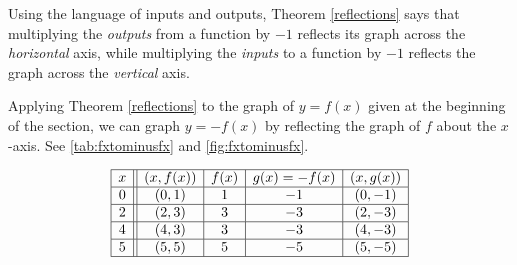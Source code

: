 Using the  language of inputs and outputs, Theorem \ref{reflections} says that multiplying the \textit{outputs} from a function by $-1$ reflects its graph across the \textit{horizontal} axis, while multiplying the \textit{inputs} to a function by $-1$ reflects the graph across the \textit{vertical} axis.

Applying Theorem \ref{reflections} to the graph of $y=f(x)$ given at the beginning of the section, we can graph $y=-f(x)$ by reflecting the graph of $f$ about the $x$-axis. See \autoref{tab:fxtominusfx} and \autoref{fig:fxtominusfx}.

\begin{table}

\[ \begin{array}{|c||c|c|c|c|}  

\hline

 x & (x,f(x)) & f(x) & g(x)=-f(x) & (x, g(x)) \\ \hline
0  & (0,1)& 1 & -1 &(0, -1) \\  \hline
2 & (2,3) & 3 &  -3 &(2,-3) \\  \hline
4 & (4,3) & 3 &  -3&(4, -3) \\  \hline
5 & (5,5) & 5 &  -5 &( 5 ,-5) \\  \hline

\end{array} \] 

\caption{}
\label{tab:fxtominusfx}
\end{table}

